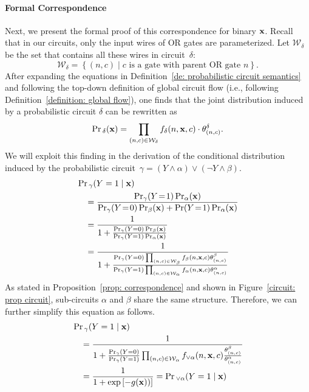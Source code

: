 \documentclass[letterpaper]{article} %
\newcommand{\sample}{{\bf x}}
\begin{document}
\paragraph{Formal Correspondence}
Next, we present the formal proof of this correspondence for binary $\sample$.
Recall that in our circuits, only the input wires of OR gates are parameterized. Let $\mathcal{W}_\delta$ be the set that contains all these wires in circuit~$\delta$: $$\mathcal{W}_\delta = \left\{(n, c) \mid c\text{ is a gate with parent OR gate } n \right\}.$$
After expanding the equations in Definition~\ref{de: probabilistic circuit semantics} and following the top-down definition of global circuit flow (i.e., following Definition~\ref{definition: global flow}), one finds that the joint distribution induced by a probabilistic circuit $\delta$ can be rewritten as
$$
\Pr{_\delta}(\sample) = \prod_{(n, c) \in \mathcal{W}_\delta} f_\delta(n,\sample,c) \cdot \theta_{(n,c)}^\delta.
$$
We will exploit this finding in the derivation of the conditional distribution induced by the probabilistic circuit~$\gamma = (Y \land \alpha) \lor (\neg Y \land \beta)$.
\begin{align}
&\Pr{_{\gamma}}(Y=1 \mid \sample) \nonumber \\
 &\quad =\frac{\Pr_\gamma(Y\!=\!1)\Pr_\alpha(\sample)}{\Pr_\gamma(Y\!=\!0)\Pr_\beta(\sample) + \Pr(Y\!=\!1)\Pr_\alpha(\sample)} \nonumber\\
&\quad = \frac{1}{1+\frac{\Pr_{\gamma}(Y=0)\Pr_\beta(\sample)}{\Pr_{\gamma}(Y=1)\Pr_\alpha(\sample)}} \nonumber \\
&\quad =\frac{1}{1+\frac{\Pr_{\gamma}(Y=0)\prod_{(n,c) \in \mathcal{W}_\beta} f_\beta(n,\sample,c)\theta_{(n,c)}^\beta}{\Pr_{\gamma}(Y=1)\prod_{(n,c) \in \mathcal{W}_\alpha} f_\alpha(n,\sample,c)\theta^\alpha_{(n,c)}}} \nonumber
\end{align}
As stated in Proposition~\ref{prop: correspondence} and shown in Figure~\ref{circuit: prop circuit}, sub-circuits $\alpha$ and $\beta$ share the same structure. Therefore, we can further simplify this equation as follows.
\begin{align}
&\Pr{_{\gamma}}(Y=1 \mid \sample) \nonumber \\
&\quad = \frac{1}{1+\frac{\Pr_{\gamma}(Y=0)}{\Pr_{\gamma}(Y=1)}\prod_{(n,c) \in \mathcal{W}_{\alpha} } f_{\lor \alpha}(n, \sample, c) \frac{\theta^\beta_{(n,c)}}{\theta^\alpha_{(n,c)}} }  \nonumber
 \\
&\quad = \frac{1}{1+\exp\left[- g(\sample)) \right]} = \Pr{_{\lor \alpha}}(Y=1 \mid \sample) \nonumber
\end{align}
\end{document}
